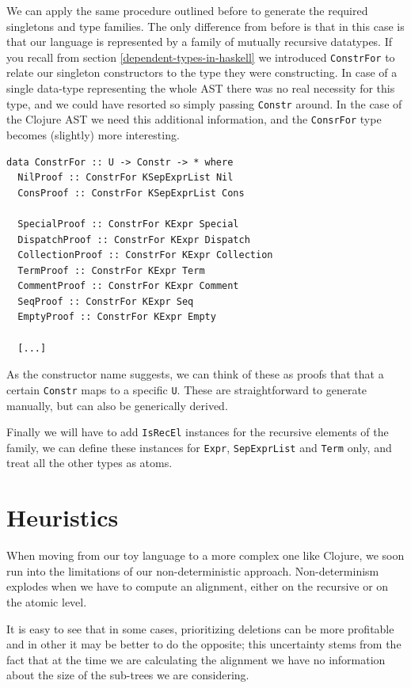 \documentclass[11pt, titlepage]{article}
\newcommand{\toHaskell}[1]{\texttt{#1}\xspace}
\begin{document}
We can apply the same procedure outlined before to generate the required singletons and type families. The only difference from before is that in this case is that our language is represented by a family of mutually recursive datatypes. If you recall from section \ref{dependent-types-in-haskell} we introduced \toHaskell{ConstrFor} to relate our singleton constructors to the type they were constructing. In case of a single data-type representing the whole AST there was no real necessity for this type, and we could have resorted so simply passing \toHaskell{Constr} around. In the case of the Clojure AST we need this additional information, and the \toHaskell{ConsrFor} type becomes (slightly) more interesting.

\begin{verbatim}
data ConstrFor :: U -> Constr -> * where
  NilProof :: ConstrFor KSepExprList Nil
  ConsProof :: ConstrFor KSepExprList Cons

  SpecialProof :: ConstrFor KExpr Special
  DispatchProof :: ConstrFor KExpr Dispatch
  CollectionProof :: ConstrFor KExpr Collection
  TermProof :: ConstrFor KExpr Term
  CommentProof :: ConstrFor KExpr Comment
  SeqProof :: ConstrFor KExpr Seq
  EmptyProof :: ConstrFor KExpr Empty
  
  [...]
\end{verbatim}

As the constructor name suggests, we can think of these as proofs that  that a certain \toHaskell{Constr} maps to a specific \toHaskell{U}. These are straightforward to generate manually, but can also be generically derived.

Finally we will have to add \toHaskell{IsRecEl} instances for the recursive elements of the family, we can define these instances for \toHaskell{Expr}, \toHaskell{SepExprList} and \toHaskell{Term} only, and treat all the other types as atoms.  



\section{Heuristics}

When moving from our toy language to a more complex one like Clojure, we soon run into the limitations of our non-deterministic approach.
Non-determinism explodes when we have to compute an alignment, either on the recursive or on the atomic level. 

It is easy to see that in some cases, prioritizing deletions can be more profitable and in other it may be better to do the opposite; this uncertainty stems from the fact that at the time we are calculating the alignment we have no information about the size of the sub-trees we are considering. 
\end{document}
